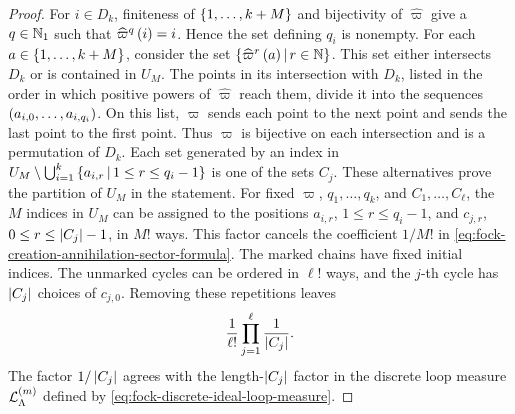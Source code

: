 \documentclass[11pt,a4paper]{article}
\theoremstyle{plain}
\theoremstyle{definition}
\theoremstyle{remark}
\begin{document}
\begin{proof}
For $i \in D_k$, finiteness of $\left\{ 1,\ldots,k+M \right\}$ and bijectivity of $\widehat{\varpi}$ give a
$q \in \mathbb{N}_1$ such that $\widehat{\varpi}^{q} \left( i \right)=i$.
Hence the set defining $q_i$ is nonempty.
For each $a \in \left\{ 1,\ldots,k+M \right\}$, consider the set
$\left\{\widehat{\varpi}^{r} \left( a \right) \, \middle| \, r \in \mathbb{N}\right\}$.
This set either intersects $D_k$ or is contained in $U_M$.
The points in its intersection with $D_k$, listed in the order in which positive powers of
$\widehat{\varpi}$ reach them, divide it into the sequences
$\left( a_{i,0},\ldots,a_{i,q_i} \right)$.
On this list, $\varpi$ sends each point to the next point and sends the last point to the first point.
Thus $\varpi$ is bijective on each intersection and is a permutation of $D_k$.
Each set generated by an index in
$U_M \setminus \bigcup_{i=1}^{k}\left\{a_{i,r} \, \middle| \, 1\leq r\leq q_i-1\right\}$ is one of the sets $C_j$.
These alternatives prove the partition of $U_M$ in the statement.
For fixed $\varpi$, $q_1,\ldots,q_k$, and $C_1,\ldots,C_{\ell}$, the $M$ indices in $U_M$ can be assigned to
the positions $a_{i,r}$, $1\leq r\leq q_i-1$, and $c_{j,r}$,
$0\leq r\leq\left| C_j \right|-1$, in $M!$ ways.
This factor cancels the coefficient $1/M!$ in
\eqref{eq:fock-creation-annihilation-sector-formula}.
The marked chains have fixed initial indices.  The unmarked cycles can be ordered in $\ell!$ ways, and the
$j$-th cycle has $\left| C_j \right|$ choices of $c_{j,0}$.  Removing these repetitions leaves
$$\begin{aligned}
\frac{1}{\ell!}
\prod_{j = 1}^{\ell}\frac{1}{\left| C_j \right|}.
\end{aligned}$$
The factor $1/\left| C_j \right|$ agrees with the length-$\left| C_j \right|$ factor in the discrete loop measure
$\mathcal{L}_{\Lambda}^{(m)}$ defined by \eqref{eq:fock-discrete-ideal-loop-measure}.
\end{proof}
\end{document}
